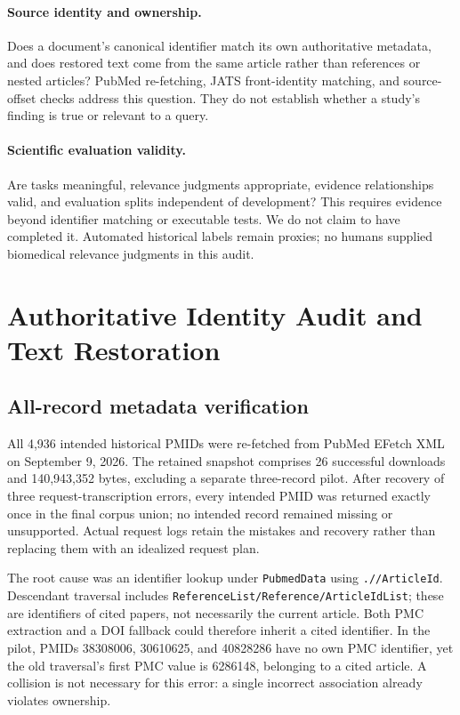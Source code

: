 \documentclass{article}
\begin{document}
\paragraph{Source identity and ownership.}
Does a document's canonical identifier match its own authoritative metadata, and does restored text come from the same article rather than references or nested articles? PubMed re-fetching, JATS front-identity matching, and source-offset checks address this question. They do not establish whether a study's finding is true or relevant to a query.

\paragraph{Scientific evaluation validity.}
Are tasks meaningful, relevance judgments appropriate, evidence relationships valid, and evaluation splits independent of development? This requires evidence beyond identifier matching or executable tests. We do not claim to have completed it. Automated historical labels remain proxies; no humans supplied biomedical relevance judgments in this audit.

\section{Authoritative Identity Audit and Text Restoration}
\label{sec:identity}
\subsection{All-record metadata verification}
All 4,936 intended historical PMIDs were re-fetched from PubMed EFetch XML on September 9, 2026. The retained snapshot comprises 26 successful downloads and 140,943,352 bytes, excluding a separate three-record pilot. After recovery of three request-transcription errors, every intended PMID was returned exactly once in the final corpus union; no intended record remained missing or unsupported. Actual request logs retain the mistakes and recovery rather than replacing them with an idealized request plan.

The root cause was an identifier lookup under \texttt{PubmedData} using \texttt{.//ArticleId}. Descendant traversal includes \texttt{ReferenceList/Reference/ArticleIdList}; these are identifiers of cited papers, not necessarily the current article. Both PMC extraction and a DOI fallback could therefore inherit a cited identifier. In the pilot, PMIDs 38308006, 30610625, and 40828286 have no own PMC identifier, yet the old traversal's first PMC value is 6286148, belonging to a cited article. A collision is not necessary for this error: a single incorrect association already violates ownership.
\end{document}
